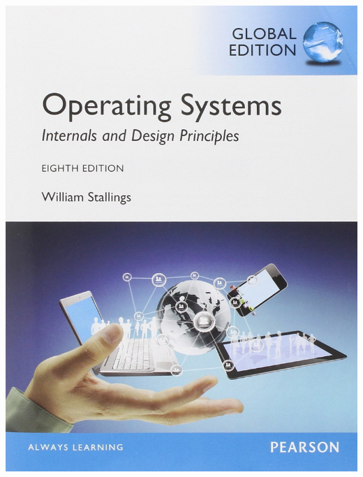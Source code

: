 \documentclass[dvipsnames,14pt,t]{beamer}
\begin{document}
\begin{frame}[c]
\begin{textblock}{11}
         {\includegraphics[scale=0.044]{pics/p5.jpg}}
  \end{textblock}


\end{frame}
\end{document}

